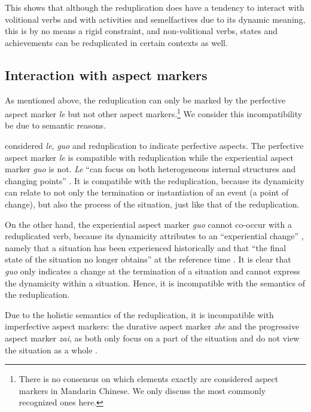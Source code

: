 \documentclass[11pt,a4paper,fleqn,draft]{article}
\begin{document}
This shows that although the reduplication does have a tendency to interact with volitional verbs and with activities and semelfactives due to its dynamic meaning, 
this is by no means a rigid constraint, 
and non\hyp{}volitional verbs, states and achievements can be reduplicated in certain contexts as well.




\subsection{Interaction with aspect markers}\label{sec:aspM}

As mentioned above, the reduplication can only be marked by the perfective aspect marker \emph{le} but not other aspect markers.\footnote{
There is no consensus on which elements exactly are considered aspect markers in Mandarin Chinese. We only discuss the most commonly recognized ones here.
}
We consider this incompatibility be due to semantic reasons.

\citet[Ch. 4]{XiaoMcEnery2004} considered \emph{le}, \emph{guo} and reduplication to indicate perfective aspects.
The perfective aspect marker \emph{le} is compatible with reduplication while the experiential aspect marker \emph{guo} is not.
\emph{Le} ``can focus on both heterogeneous internal structures and changing points'' \citep[129]{XiaoMcEnery2004}.
It is compatible with the reduplication, because its dynamicity can relate to not only the termination or instantiation of an event (a point of change), but also the process of the situation, just like that of the reduplication.

On the other hand, the experiential aspect marker \emph{guo} cannot co\hyp{}occur with a reduplicated verb, 
because its dynamicity attributes to an ``experiential change'' \citep[148]{XiaoMcEnery2004}, 
namely that a situation has been experienced historically and that ``the final state of the situation no longer obtains'' at the reference time \citep[144]{XiaoMcEnery2004}. 
It is clear that \emph{guo} only indicates a change at the termination of a situation and cannot express the dynamicity within a situation.
Hence, it is incompatible with the semantics of the reduplication.

Due to the holistic semantics of the reduplication, it is incompatible with imperfective aspect markers: the durative aspect marker \emph{zhe} and the progressive aspect marker \emph{zai}, as both only focus on  a part of the situation and do not view the situation as a whole \citep[Ch. 5]{XiaoMcEnery2004}.
\end{document}
